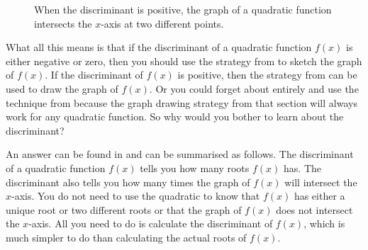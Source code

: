 \documentclass[a4paper,oneside,12pt]{article}
\begin{document}
\begin{figure}[!htbp]
\centering
{}
\qquad
\caption{%
  When the discriminant is positive, the graph of a quadratic function
  intersects the $x$-axis at two different points.
}
\label{fig:positive_discriminant}
\end{figure}

What all this means is that if the discriminant of a quadratic
function $f(x)$ is either negative or zero, then you should use the
strategy from  to sketch the graph of
$f(x)$.  If the discriminant of $f(x)$ is positive, then the strategy
from  can be used to draw the graph of
$f(x)$.  Or you could forget about 
entirely and use the technique from  because
the graph drawing strategy from that section will always work for any
quadratic function.  So why would you bother to learn about the
discriminant?

An answer can be found in
 and can
be summarised as follows.  The discriminant of a quadratic function
$f(x)$ tells you how many roots $f(x)$ has.  The discriminant also
tells you how many times the graph of $f(x)$ will intersect the
$x$-axis.  You do not need to use the quadratic
 to know that $f(x)$ has either a
unique root or two different roots or that the graph of $f(x)$ does
not intersect the $x$-axis.  All you need to do is calculate the
discriminant of $f(x)$, which is much simpler to do than calculating
the actual roots of $f(x)$.
\end{document}
